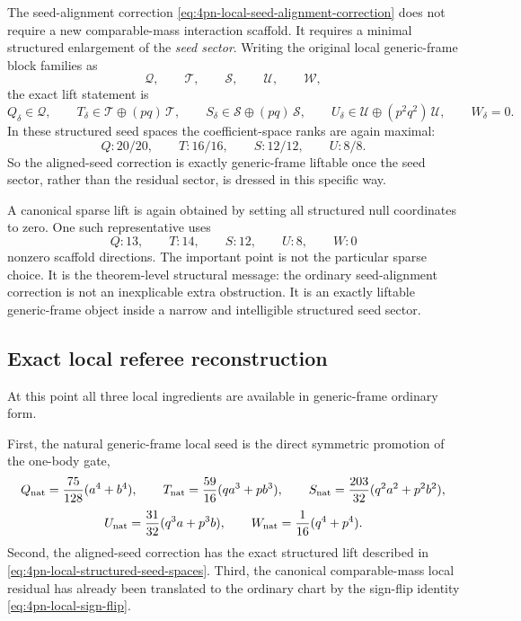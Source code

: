 \documentclass[11pt]{article}
\begin{document}
The seed-alignment correction \eqref{eq:4pn-local-seed-alignment-correction}
does not require a new comparable-mass interaction scaffold.  It requires a
minimal structured enlargement of the \emph{seed sector}.  Writing the original
local generic-frame block families as
\[
\mathcal Q,
\qquad
\mathcal T,
\qquad
\mathcal S,
\qquad
\mathcal U,
\qquad
\mathcal W,
\]
the exact lift statement is
\begin{equation}
Q_\delta \in \mathcal Q,
\qquad
T_\delta \in \mathcal T\oplus(pq)\,\mathcal T,
\qquad
S_\delta \in \mathcal S\oplus(pq)\,\mathcal S,
\qquad
U_\delta \in \mathcal U\oplus(p^2q^2)\,\mathcal U,
\qquad
W_\delta = 0.
\label{eq:4pn-local-structured-seed-spaces}
\end{equation}
In these structured seed spaces the coefficient-space ranks are again maximal:
\begin{equation}
Q:20/20,
\qquad
T:16/16,
\qquad
S:12/12,
\qquad
U:8/8.
\label{eq:4pn-local-structured-seed-ranks}
\end{equation}
So the aligned-seed correction is exactly generic-frame liftable once the seed
sector, rather than the residual sector, is dressed in this specific way.

A canonical sparse lift is again obtained by setting all structured null
coordinates to zero.  One such representative uses
\begin{equation}
Q:13,
\qquad
T:14,
\qquad
S:12,
\qquad
U:8,
\qquad
W:0
\label{eq:4pn-local-structured-seed-sparsity}
\end{equation}
nonzero scaffold directions.  The important point is not the particular sparse
choice.  It is the theorem-level structural message: the ordinary seed-alignment
correction is not an inexplicable extra obstruction.  It is an exactly liftable
generic-frame object inside a narrow and intelligible structured seed sector.

\subsection{Exact local referee reconstruction}
\label{sec:local-referee-reconstruction}

At this point all three local ingredients are available in generic-frame
ordinary form.

First, the natural generic-frame local seed is the direct symmetric promotion of
the one-body gate,
\begin{equation}
Q_{\rm nat}=\frac{75}{128}(a^4+b^4),
\qquad
T_{\rm nat}=\frac{59}{16}(qa^3+pb^3),
\qquad
S_{\rm nat}=\frac{203}{32}(q^2a^2+p^2b^2),
\label{eq:4pn-local-natural-generic-seed-1}
\end{equation}
\begin{equation}
U_{\rm nat}=\frac{31}{32}(q^3a+p^3b),
\qquad
W_{\rm nat}=\frac{1}{16}(q^4+p^4).
\label{eq:4pn-local-natural-generic-seed-2}
\end{equation}
Second, the aligned-seed correction has the exact structured lift described in
\eqref{eq:4pn-local-structured-seed-spaces}.  Third, the canonical comparable-mass
local residual has already been translated to the ordinary chart by the sign-flip
identity \eqref{eq:4pn-local-sign-flip}.
\end{document}
